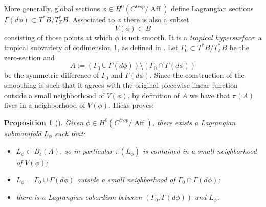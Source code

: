 \documentclass[10pt]{amsart}
\newtheorem{prop}[thm]{Proposition}
\theoremstyle{definition}
\theoremstyle{remark}
\def\Z{\mathbb{Z}}
\DeclareMathOperator{\Aff}{Aff}
\begin{document}
More generally, global sections $\phi\in H^0(C^{trop}/\Aff)$ define Lagrangian sections $\Gamma(d\phi) \subset T^*B /T^*_\Z B$.
Associated to $\phi$ there is also  a subset
$$
V(\phi) \subset B
$$ 
consisting of those points at which $\phi$ is not smooth.
It is a \emph{tropical hypersurface}: a tropical subvariety of codimension 1, as defined in .
Let $\Gamma_0 \subset T^*B/T_\Z^* B$ be the zero-section and
$$
 A := (\Gamma_0 \cup \Gamma(d\phi)) \setminus (\Gamma_0 \cap \Gamma(d\phi))
$$
be the symmetric difference of $\Gamma_0$ and $\Gamma(d\phi)$.
Since the construction of the smoothing is such that it agrees with the original piecewise-linear function outside a small neighborhood of $V(\phi)$, by definition of $A$ we have that $\pi(A)$ lives in a neighborhood of $V(\phi)$.
Hicks proves:
\begin{prop}[\cite{hicks2020tropical}]\label{prop:hicks}
    Given $\phi \in H^0(C^{trop}/\Aff)$, there  exists a Lagrangian submanifold $L_\phi$ such that:
    \begin{itemize}
        \item $L_\phi \subset B_\epsilon(A)$, so in particular $\pi(L_\phi)$ is contained in a small neighborhood of $V(\phi)$;
        
        \item $L_\phi = \Gamma_0 \cup \Gamma(d\phi)$ outside a small neighborhood of $\Gamma_0 \cap \Gamma(d\phi)$;
        
        \item there is a Lagrangian cobordism between $(\Gamma_0,\Gamma(d\phi))$ and $L_\phi$.
    \end{itemize}
\end{prop}
\end{document}
